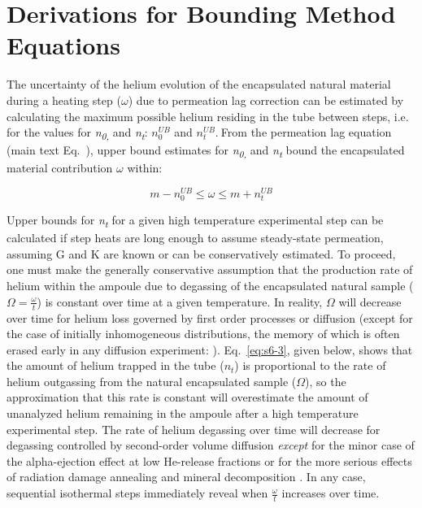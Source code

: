
\section{Derivations for Bounding Method Equations}\label{estimate-permeation-lag-uncertainty-for-uncorrected-long-heating-steps}

The uncertainty of the helium evolution of the encapsulated natural
material during a heating step (\(\omega\)) due to permeation lag
correction can be estimated by calculating the maximum possible helium
residing in the tube between steps, i.e. for the values for
\emph{n\textsubscript{0, }}and \emph{n\textsubscript{t}}: \(n_{0}^{UB}\)
and \(n_{t}^{UB}.\ \)From the permeation lag equation (main text Eq.~\MainEqPermlag), upper bound estimates for
\emph{n\textsubscript{0, }}and \emph{n\textsubscript{t}} bound the
encapsulated material contribution \(\omega\) within:

\begin{equation}
m - n_{0}^{UB} \leq \omega \leq m + n_{t}^{UB}
\label{eq:s6-1}
\end{equation}

Upper bounds for \emph{n\textsubscript{t}} for a given high temperature
experimental step can be calculated if step heats are long enough to
assume steady-state permeation, assuming G and K are known or can be
conservatively estimated. To proceed, one must make the generally
conservative assumption that the production rate of helium within the
ampoule due to degassing of the encapsulated natural sample
(\(\Omega = \frac{\omega}{t}\)) is constant over time at a given
temperature. In reality, \(\Omega\) will decrease over time for helium
loss governed by first order processes \citep{yakubovich2010,wilson1973} or diffusion (except for the case of initially
inhomogeneous distributions, the memory of which is often erased early
in any diffusion experiment: \citealp{shuster2004}). Eq.~\eqref{eq:s6-3}, given
below, shows that the amount of helium trapped in the tube (\(n_{t}\))
is proportional to the rate of helium outgassing from the natural
encapsulated sample (\(\Omega\)), so the approximation that this rate is
constant will overestimate the amount of unanalyzed helium remaining in
the ampoule after a high temperature experimental step. The rate of
helium degassing over time will decrease for degassing controlled by
second-order volume diffusion \emph{except} for the minor case of the
alpha-ejection effect at low He-release fractions \citep{farley1996,ketcham2011} or for the more serious effects of radiation
damage annealing \citep{goldsmith2020} and mineral decomposition
\citep{farley2024}. In any case, sequential isothermal steps
immediately reveal when \(\frac{\omega}{t}\) increases over time.

